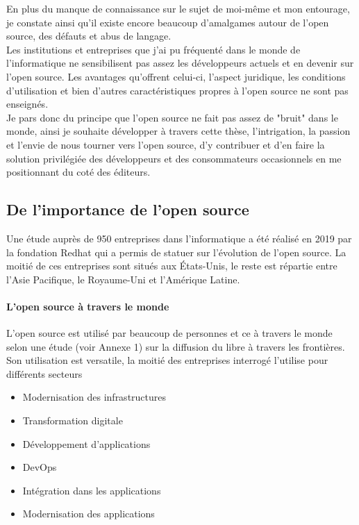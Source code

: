 			En plus du manque de connaissance sur le sujet de moi-même et mon entourage, je constate ainsi qu'il existe encore beaucoup d'amalgames autour de l'open source, des défauts et abus de langage.\\
			Les institutions et entreprises que j'ai pu fréquenté dans le monde de l'informatique ne sensibilisent pas assez les développeurs actuels et en devenir sur l'open source. Les avantages qu'offrent celui-ci, l'aspect juridique, les conditions d'utilisation et bien d'autres caractéristiques propres à l'open source ne sont pas enseignés.\\

			Je pars donc du principe que l'open source ne fait pas assez de "bruit" dans le monde, ainsi je souhaite développer à travers cette thèse, l'intrigation, la passion et l'envie de nous tourner vers l'open source, d'y contribuer et d'en faire la solution privilégiée des développeurs et des consommateurs occasionnels en me positionnant du coté des éditeurs.

		\subsection{De l'importance de l'open source}

				Une étude auprès de 950 entreprises dans l'informatique a été réalisé en 2019 par la fondation Redhat qui a permis de statuer sur l'évolution de l'open source. La moitié de ces entreprises sont situés aux États-Unis, le reste est répartie entre l'Asie Pacifique, le Royaume-Uni et l'Amérique Latine.

				\paragraph{L'open source à travers le monde\\}

					L'open source est utilisé par beaucoup de personnes et ce à travers le monde selon une étude (voir Annexe 1) sur la diffusion du libre à travers les frontières.
					Son utilisation est versatile, la moitié des entreprises interrogé l'utilise pour différents secteurs 

					\begin{itemize}[label=\textbullet, font=\LARGE \color{burntorange}]
					\item Modernisation des infrastructures
					\item Transformation digitale
					\item Développement d'applications
					\item DevOps
					\item Intégration dans les applications
					\item Modernisation des applications
					\end{itemize}

